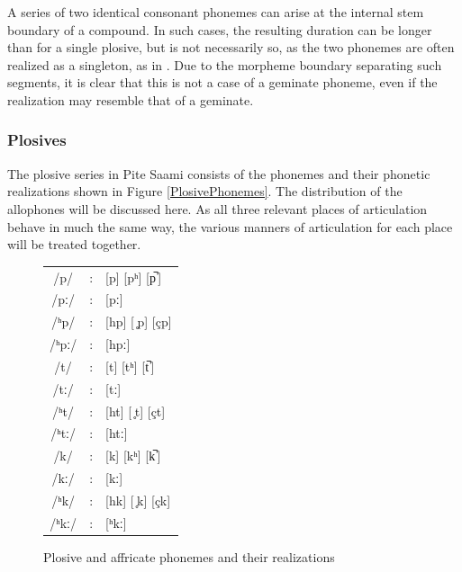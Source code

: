 A series of two identical consonant phonemes can arise at the internal stem boundary of a compound. In such cases, the resulting duration can be longer than for a single plosive, but is not necessarily so, as the two phonemes are often realized as a singleton, as in .
Due to the morpheme boundary separating such segments, it is clear that this is not a case of a geminate phoneme, even if the realization may resemble that of a geminate. 


\subsubsection{Plosives}\label{Plosives}%
The plosive series in Pite Saami consists of the phonemes and their phonetic realizations shown in Figure \vref{PlosivePhonemes}. The distribution of the allophones will be discussed here. As all three relevant places of articulation behave in much the same way, the various manners of articulation for each place will be treated together.
\begin{figure}\begin{center}
\begin{tabular}{c c l}
/p/ &:& [p] [pʰ] [p̚\,] \\ %
/pː/ &:& [pː] \\ %
/ʰp/ &:& [hp] [ ̥p] [çp]  \\ %
/ʰpː/ &:& [hpː] \\ %
/t/ &:& [t] [tʰ] [t̚\,] \\%
/tː/ &:& [tː] \\
/ʰt/ &:& [ht] [ ̥t] [çt] \\
/ʰtː/ &:& [htː] \\
/k/ &:& [k] [kʰ] [k̚\,] \\
/kː/ &:& [kː] \\
/ʰk/ &:& [hk] [ ̥k] [çk]  \\
/ʰkː/ &:& [ʰkː] \\
\end{tabular}
\end{center}
\caption{Plosive and affricate phonemes and their realizations}\label{PlosivePhonemes}
\end{figure}



